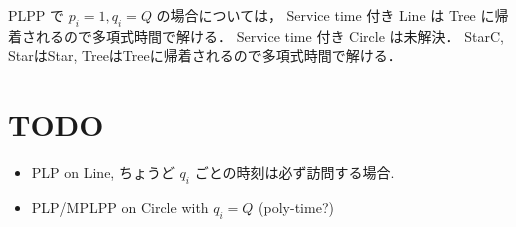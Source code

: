PLPP で $p_i = 1, q_i = Q$ の場合については，
Service time 付き Line は Tree に帰着されるので多項式時間で解ける．
Service time 付き Circle は未解決．
StarC, StarはStar, TreeはTreeに帰着されるので多項式時間で解ける．






\section{TODO}
\begin{itemize}
	\item PLP on Line, ちょうど $q_i$ ごとの時刻は必ず訪問する場合.
	\item PLP/MPLPP on Circle with $q_i = Q$ (poly-time?)
\end{itemize}

